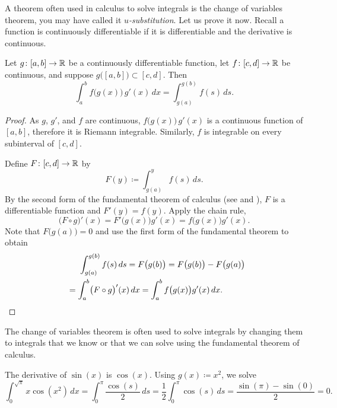 A theorem often used in calculus to solve integrals is the change of
variables theorem, you may have called it \emph{$u$-substitution}.
Let us prove it now.  Recall 
a function is continuously differentiable if
it is differentiable and the derivative is continuous.

\begin{thm}
Let $g \colon [a,b] \to {\mathbb{R}}$ be a continuously differentiable function,
let $f \colon [c,d] \to {\mathbb{R}}$ be continuous, and suppose
$g\bigl([a,b]\bigr) \subset [c,d]$.  Then
\begin{equation*}
\int_a^b f\bigl(g(x)\bigr)\, g'(x)\, dx =
\int_{g(a)}^{g(b)} f(s)\, ds .
\end{equation*}
\end{thm}

\begin{proof}
As $g$, $g'$, and $f$ are continuous, $f\bigl(g(x)\bigr)\,g'(x)$
is a continuous function of $[a,b]$, therefore it is Riemann integrable.
Similarly, $f$ is integrable on every subinterval of $[c,d]$.

Define $F \colon [c,d] \to {\mathbb{R}}$ by
\begin{equation*}
F(y) \coloneqq \int_{g(a)}^{y} f(s)\,ds .
\end{equation*}
By the second form of the fundamental
theorem of calculus
(see  and ),
$F$ is a differentiable function and $F'(y) = f(y)$.  Apply the chain
rule,
\begin{equation*}
\bigl( F \circ g \bigr)' (x) =
F'\bigl(g(x)\bigr) g'(x)
=
f\bigl(g(x)\bigr) g'(x) .
\end{equation*}
Note that $F\bigl(g(a)\bigr) = 0$ and
use the first form of the fundamental theorem
to obtain
\begin{multline*}
\qquad %
\int_{g(a)}^{g(b)} f(s)\,ds = F\bigl(g(b)\bigr) = F\bigl(g(b)\bigr)-F\bigl(g(a)\bigr)
\\
=
\int_a^b 
\bigl( F \circ g \bigr)' (x) \,dx
=
\int_a^b 
f\bigl(g(x)\bigr) g'(x)
\,dx .
\qquad %
\qedhere
\end{multline*}
\end{proof}

The change of variables theorem is often used to solve integrals by changing them
to integrals that we know or that we can solve using the fundamental theorem of
calculus.

\begin{example}
The derivative of $\sin(x)$ is $\cos(x)$.
Using $g(x) \coloneqq x^2$, we solve
\begin{equation*}
\int_0^{\sqrt{\pi}} x \cos(x^2) \, dx = \int_0^\pi \frac{\cos(s)}{2} \, ds
=
\frac{1}{2}
\int_0^\pi \cos(s) \, ds
=
\frac{
\sin(\pi) - \sin(0)
}{2}
=
0 .
\end{equation*}
\end{example}

